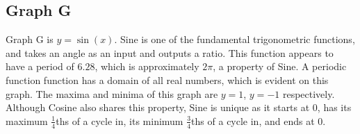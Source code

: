 \subsection{Graph G}

Graph G is $y=\sin(x)$.
Sine is one of the fundamental trigonometric functions, and takes an angle as an input and outputs a ratio.
This function appears to have a period of ${6.28}$, which is approximately ${2\pi}$, a property of Sine.
A periodic function function has a domain of all real numbers, which is evident on this graph.
The maxima and minima of this graph are $y=1$, $y={-1}$ respectively.
Although Cosine also shares this property, Sine is unique as it starts at 0, has its maximum $\frac{1}{4}$ths of a cycle in, its minimum $\frac{3}{4}$ths of a cycle in, and ends at $0$.
